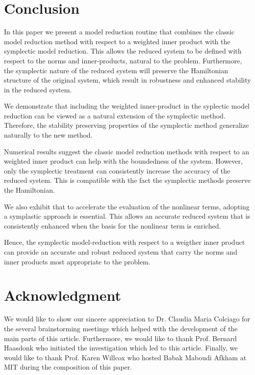 \section{Conclusion}
In this paper we present a model reduction routine that combines the classic model reduction method with respect to a weighted inner product with the symplectic model reduction. This allows the reduced system to be defined with respect to the norms and inner-products, natural to the problem. Furthermore, the symplectic nature of the reduced system will preserve the Hamiltonian structure of the original system, which result in robustness and enhanced stability in the reduced system.

We demonstrate that including the weighted inner-product in the syplectic model reduction can be viewed as a natural extension of the symplectic method. Therefore, the stability preserving properties of the symplectic method generalize naturally to the new method.

Numerical results suggest the classic model reduction methods with respect to an weighted inner product can help with the boundedness of the system. However, only the symplectic treatment can consistently increase the accuracy of the reduced system. This is compatible with the fact the symplectic methods preserve the Hamiltonian.

We also exhibit that to accelerate the evaluation of the nonlinear terms, adopting a symplastic approach is essential. This allows an accurate reduced system that is consistently enhanced when the basis for the nonlinear term is enriched.

Hence, the symplectic model-reduction with respect to a weigther inner product can provide an accurate and robust reduced system that carry the norms and inner products most appropriate to the problem.

\section*{Acknowledgment} We would like to show our sincere appreciation to Dr. Claudia Maria Colciago for the several brainstorming meetings which helped with the development of the main parts of this article. Furthermore, we would like to thank Prof. Bernard Haasdonk who initiated the investigation which led to this article. Finally, we would like to thank Prof. Karen Willcox who hosted Babak Maboudi Afkham at MIT during the composition of this paper. 
